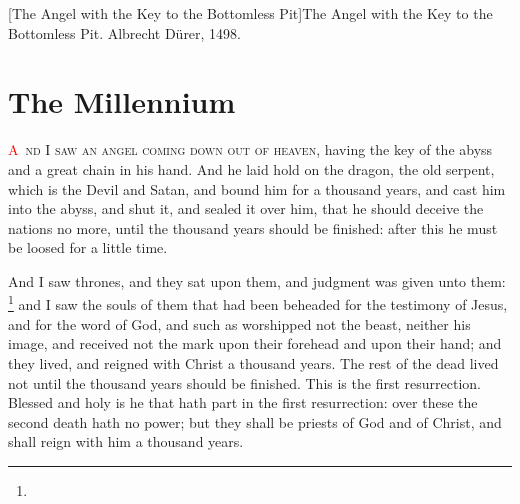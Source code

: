 [The Angel with the Key to the Bottomless Pit]{The Angel with the Key to the Bottomless Pit. Albrecht Dürer, 1498.}

\chapter{The Millennium}
\lettrine[lines=3,slope=0.5em]{\textcolor{red}{A}}{\ nd I saw an angel coming down out of heaven}, having the key of the abyss and a great chain in his hand. 
And he laid hold on the dragon, the old serpent, which is the Devil and Satan, and bound him for a thousand years, 
and cast him into the abyss, and shut it,%
and sealed it over him, that he should deceive the nations no more, until the thousand years should be finished: after this he must be loosed for a little time.

And I saw thrones, and they sat upon them, and judgment was given unto them:%
	\footnote{ %
			  } %
and I saw the souls of them that had been beheaded for the testimony of Jesus, and for the word of God, and such as worshipped not the beast, neither his image, and received not the mark upon their forehead and upon their hand; and they lived,%
and reigned with Christ a thousand years.%
The rest of the dead lived not until the thousand years should be finished. This is the first resurrection. 
Blessed and holy is he that hath part in the first resurrection: over these the second death hath no power; but they shall be priests of God and of Christ, and shall reign with him a thousand years.

